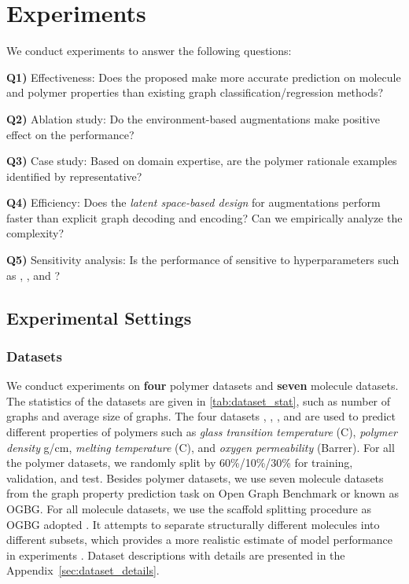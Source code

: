 \documentclass[sigconf]{acmart}
\begin{document}
\section{Experiments}
\label{sec:experiments}
We conduct experiments to answer the following questions:
\begin{compactitem}
\item \textbf{Q1)} Effectiveness: Does the proposed \method make more accurate prediction on molecule and polymer properties than existing graph classification/regression methods?
\item \textbf{Q2)} Ablation study: Do the environment-based augmentations make positive effect on the performance?
\item \textbf{Q3)} Case study: Based on domain expertise, are the polymer rationale examples identified by \method representative? 
\item \textbf{Q4)} Efficiency: Does the \emph{latent space-based design} for augmentations perform faster than explicit graph decoding and encoding? Can we empirically analyze the complexity?
\item \textbf{Q5)} Sensitivity analysis: Is the performance of \method sensitive to hyperparameters such as , , and ?
\end{compactitem}

\vspace{-0.05in}
\subsection{Experimental Settings}

\subsubsection{Datasets} 
We conduct experiments on \textbf{four} polymer datasets and \textbf{seven} molecule datasets. 
The statistics of the datasets are given in \cref{tab:dataset_stat}, such as number of graphs and average size of graphs. The four datasets \glassTemp, \meltTemp, \density, and \oxygen are used to predict different properties of polymers such as \emph{glass transition temperature} (C), \emph{polymer density} g/cm, \emph{melting temperature} (C), and \emph{oxygen permeability} (Barrer). For all the polymer datasets, we randomly split by 60\%/10\%/30\% for training, validation, and test. 
Besides polymer datasets, we use seven molecule datasets from the graph property prediction task on Open Graph Benchmark or known as OGBG. For all molecule datasets, we use the scaffold splitting procedure as OGBG adopted \cite{hu2020open}. It attempts to separate structurally different molecules into different subsets, which provides a more realistic estimate of model performance in experiments \cite{wu2018moleculenet}. Dataset descriptions with details are presented in the Appendix~\ref{sec:dataset_details}. 
\end{document}
